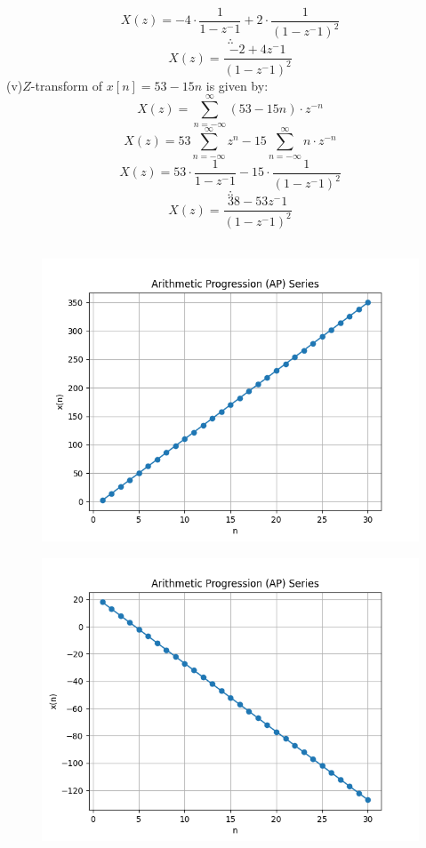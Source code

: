 \documentclass[journal,12pt,twocolumn]{IEEEtran}
\theoremstyle{remark}
\begin{document}
\[X(z)=-4 \cdot \frac{1}{1-{z^-1}}+ 2 \cdot \frac{1}{(1-{z^-1})^2}\]
$$\therefore$$ \[X(z)=\frac{-2+4{z^-1}}{(1-{z^-1})^2}\]
(v)$Z$-transform of $x[n] = 53 - 15n$ is given by:
\[ X(z) = \sum_{n=-\infty}^{\infty} (53 - 15n) \cdot z^{-n} \]
\[X(z)=53 \sum_{n=-\infty}^{\infty}z^{n}-15 \sum_{n=-\infty}^{\infty} n\cdot z^{-n}\]
\[X(z)=53 \cdot \frac{1}{1-{z^-1}}- 15 \cdot \frac{1}{(1-{z^-1})^2}\]
$$\therefore$$ \[X(z)=\frac{38-53{z^-1}}{(1-{z^-1})^2}\]\\
\begin{figure}[h]
       \centering
        \includegraphics[width=0.8\linewidth]{figures/download.png} %
        \caption{}
   \label{fig:your_label}
\end{figure}
\begin{figure}[h]
      \centering
       \includegraphics[width=0.8\linewidth]{figures/download2.png} %
        \caption{}
    \end{figure}
\end{document}
